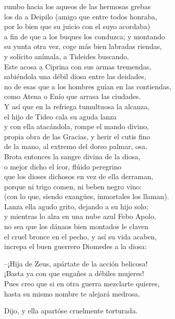 rumbo hacia los aqueos de las hermosas grebas\\
los da a Deipilo (amigo que entre todos honraba,\\
por lo bien que su juicio con el suyo acordaba)\\
a fin de que a los buques los conduzca; y montando\\
su yunta otra vez, coge más bien labradas riendas,\\
y solícito anímala, a Tideides buscando.\\
Este acosa a Ciprina con sus armas tremendas,\\
sabiéndola una débil diosa entre las deidades,\\
no de esas que a los hombres guían en las contiendas,\\
como Atena o Enío que arrasa las ciudades.\\
Y así que en la refriega tumultuosa la alcanza,\\
el hijo de Tideo cala su aguda lanza\\
y con ella atacándola, rompe el mando divino,\\
propia obra de las Gracias, y herir el cutis fino\\
de la mano, al extremo del dorso palmar, osa.\\
Brota entonces la sangre divina de la diosa,\\
o mejor dicho el ícor, flúido peregrino\\
que los dioses dichosos en vez de ella derraman,\\
porque ni trigo comen, ni beben negro vino:\\
(con lo que, siendo exangües, inmortales los llaman).\\
Lanza ella agudo grito, dejando a su hijo solo;\\
y mientras lo alza en una nube azul Febo Apolo,\\
no sea que los dánaos bien montados le claven\\
el cruel bronce en el pecho, y así su vida acaben,\\
increpa el buen guerrero Diomedes a la diosa:\par
--¡Hija de Zeus, apártate de la acción belicosa!\\
¡Basta ya con que engañes a débiles mujeres!\\
Pues creo que si en otra guerra mezclarte quieres,\\
hasta su mismo nombre te alejará medrosa.\par
Dijo, y ella apartóse cruelmente torturada.\\
